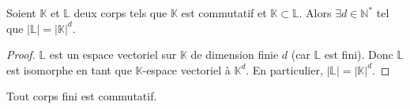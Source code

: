





	\begin{lemma}
		\label{theoreme-de-wedderburn-1}
		Soient $\mathbb{K}$ et $\mathbb{L}$ deux corps tels que $\mathbb{K}$ est commutatif et $\mathbb{K} \subset \mathbb{L}$. Alors $\exists d \in \mathbb{N}^*$ tel que $|\mathbb{L}| = |\mathbb{K}|^d$.
	\end{lemma}

	\begin{proof}
		$\mathbb{L}$ est un espace vectoriel sur $\mathbb{K}$ de dimension finie $d$ (car $\mathbb{L}$ est fini). Donc $\mathbb{L}$ est isomorphe en tant que $\mathbb{K}$-espace vectoriel à $\mathbb{K}^d$. En particulier, $|\mathbb{L}| = |\mathbb{K}|^d$.
	\end{proof}

	\begin{theorem}[Wedderburn]
		Tout corps fini est commutatif.
	\end{theorem}

